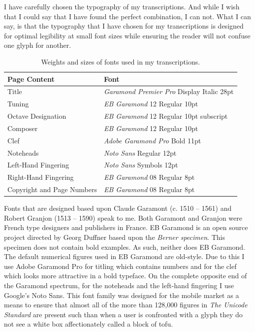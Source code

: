\documentclass[nofonts,nobib]{tufte-handout}
\begin{document}
  I have carefully chosen the typography of my transcriptions. And while I wish that I could say that I have found the perfect combination, I can not. What I can say, is that the typography that I have chosen for my transcriptions is designed for optimal legibility at small font sizes while ensuring the reader will not confuse one glyph for another.
  \begin{table}\centering
    \small
    \begin{tabular}{l l}\toprule
      Page Content  & Font \\\midrule
      Title & \emph{Garamond Premier Pro} Display Italic 28pt\\
      Tuning & \emph{EB Garamond} 12 Regular 10pt\\
      Octave Designation & \emph{EB Garamond} 12 Regular 10pt subscript\\
      Composer & \emph{EB Garamond} 12 Regular 10pt\\
      Clef & \emph{Adobe Garamond Pro} Bold 11pt\\
      Noteheads & \emph{Noto Sans} Regular 12pt\\
      Left-Hand Fingering & \emph{Noto Sans} Symbols 12pt\\
      Right-Hand Fingering & \emph{EB Garamond} 08 Regular 8pt\\
      Copyright and Page Numbers & \emph{EB Garamond} 08 Regular 8pt\\
      \bottomrule
  \end{tabular}
    \caption{Weights and sizes of fonts used in my transcriptions.}
\end{table}
Fonts that are designed based upon Claude Garamont (c. 1510 -- 1561) and Robert Granjon (1513 -- 1590) speak to me. Both Garamont and Granjon were French type designers and publishers in France. EB Garamond is an open source project directed by Georg Duffner based upon the \emph{Berner specimen}. This specimen does not contain bold examples. As such, neither does EB Garamond. The default numerical figures used in EB Garamond are old-style. Due to this I use Adobe Garamond Pro for titling which contains numbers and for the clef which looks more attractive in a bold typeface. On the complete opposite end of the Garamond spectrum, for the noteheads and the left-hand fingering I use Google's Noto Sans. This font family was designed for the mobile market as a means to ensure that almost all of the more than 128,000 figures in \emph{The Unicode Standard} are present such than when a user is confronted with a glyph they do not see a white box affectionately called a block of tofu. 
\end{document}
